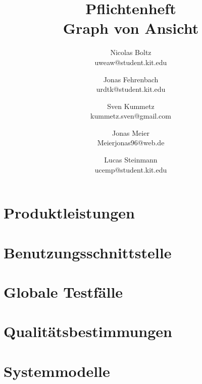 \documentclass[a4paper]{scrreprt}
\begin{document}
\title{Pflichtenheft\\
Graph von Ansicht}
\date{}
\author{Nicolas Boltz   \\ uweaw@student.kit.edu
  \and Jonas Fehrenbach \\ urdtk@student.kit.edu
  \and Sven Kummetz     \\ kummetz.sven@gmail.com
  \and Jonas Meier      \\ Meierjonas96@web.de
  \and Lucas Steinmann  \\ ucemp@student.kit.edu
}
\maketitle


\tableofcontents











\chapter{Produktleistungen}\label{ch:leistungen}

\chapter{Benutzungsschnittstelle}

\chapter{Globale Testfälle}

\chapter{Qualitätsbestimmungen}

\chapter{Systemmodelle}

\clearpage
\printglossary[type=\acronymtype]
\printglossary[title=Glossar,toctitle=Glossar]

\listoffigures
\end{document}
